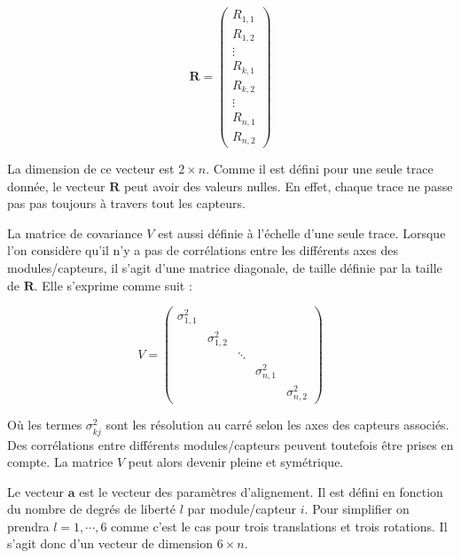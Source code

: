    \begin{equation}
    \mathbf{R} = \begin{pmatrix} R_{1,1} \\ R_{1,2} \\ \vdots \\ R_{k,1} \\ R_{k,2} \\ \vdots \\ R_{n,1} \\ R_{n,2}  \end{pmatrix}
   \end{equation}

   La dimension de ce vecteur est $2 \times n$. Comme il est d\'efini pour une seule trace donn\'ee, le vecteur $\mathbf{R}$ peut avoir des valeurs nulles. En effet, chaque trace ne passe pas pas toujours \`a travers tout les capteurs.
   
    \medskip
    
   La matrice de covariance $V$ est aussi d\'efinie \`a l'\'echelle d'une seule trace. Lorsque l'on consid\`ere qu'il n'y a pas de corrélations entre les diff\'erents axes des modules/capteurs, il s'agit d'une matrice diagonale, de taille définie par la taille de $\mathbf{R}$. Elle s'exprime comme suit :
    
    \begin{equation}
     V = \begin{pmatrix} \sigma^2_{1,1} \\ & \sigma^2_{1,2} & & \\ & & \ddots \\ & & & \sigma^2_{n,1} \\ & & & & \sigma^2_{n,2} \end{pmatrix}
    \end{equation}
 
   O\`u les termes $\sigma^2_{kj}$ sont les r\'esolution au carr\'e selon les axes des capteurs associ\'es. Des corr\'elations entre diff\'erents modules/capteurs peuvent toutefois \^etre prises en compte. La matrice $V$ peut alors devenir pleine et sym\'etrique.
   
   \medskip
   
   Le vecteur $\mathbf{a}$ est le vecteur des param\`etres d'alignement. Il est d\'efini en fonction du nombre de degr\'es de libert\'e $l$ par module/capteur $i$. Pour simplifier on prendra $l=1,\cdots,6$ comme c'est le cas pour trois translations et trois rotations. Il s'agit donc d'un vecteur de dimension $6 \times n$.
   
